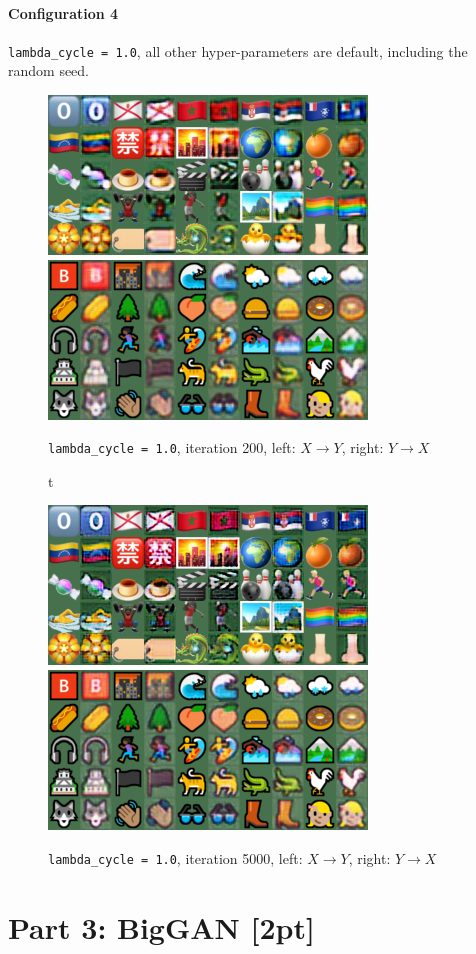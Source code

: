 \documentclass{article}
\begin{document}
	\paragraph{Configuration 4} \texttt{lambda\_cycle = 1.0}, all other hyper-parameters are default, including the random seed.
	\begin{figure}[H]
		\centering
		\caption{ \texttt{lambda\_cycle = 1.0}, iteration 200, left: $X \to Y$, right: $Y \to X$}
		\includegraphics[width=0.45\linewidth]{./samples_cyclegan_Q3_lambda1/sample-000200-X-Y.png}
		\includegraphics[width=0.45\linewidth]{./samples_cyclegan_Q3_lambda1/sample-000200-Y-X.png}
	\end{figure}
	\begin{figure}[H]t
		\centering
		\caption{ \texttt{lambda\_cycle = 1.0}, iteration 5000, left: $X \to Y$, right: $Y \to X$}
		\includegraphics[width=0.45\linewidth]{./samples_cyclegan_Q3_lambda1/sample-005000-X-Y.png}
		\includegraphics[width=0.45\linewidth]{./samples_cyclegan_Q3_lambda1/sample-005000-Y-X.png}
	\end{figure}

	\section{Part 3: BigGAN [2pt]}
\end{document}
